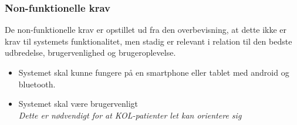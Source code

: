 \subsubsection{Non-funktionelle krav}
De non-funktionelle krav er opstillet ud fra den overbevisning, at dette ikke er krav til systemets funktionalitet, men stadig er relevant i relation til den bedste udbredelse, brugervenlighed og brugeroplevelse. 

\begin{itemize}
\item Systemet skal kunne fungere på en smartphone eller tablet med android og bluetooth. 
\item Systemet skal være brugervenligt
	\\
	\textit{Dette er nødvendigt for at KOL-patienter let kan orientere sig}
\end{itemize}



